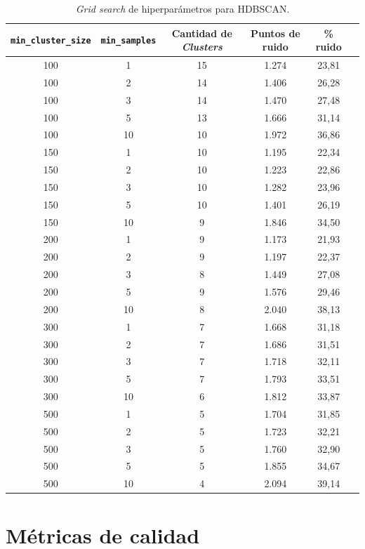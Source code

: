 \documentclass[a4paper,10pts,openany]{book}
\begin{document}
	\begin{table}[h]
		\centering
		\begin{tabular}{cccccc}
			\toprule
			\texttt{min\_cluster\_size} & \texttt{min\_samples} & Cantidad de \emph{Clusters} & Puntos de ruido & \% ruido \\
			\midrule
			100 & 1  & 15 & 1.274 & 23{,}81 \\
			100 & 2  & 14 & 1.406 & 26{,}28 \\
			100 & 3  & 14 & 1.470 & 27{,}48 \\
			100 & 5  & 13 & 1.666 & 31{,}14 \\
			100 & 10 & 10 & 1.972 & 36{,}86 \\
			150 & 1  & 10 & 1.195 & 22{,}34 \\
			150 & 2  & 10 & 1.223 & 22{,}86 \\
			150 & 3  & 10 & 1.282 & 23{,}96 \\
			150 & 5  & 10 & 1.401 & 26{,}19 \\
			150 & 10 & 9  & 1.846 & 34{,}50 \\
			200 & 1  & 9  & 1.173 & 21{,}93 \\
			200 & 2  & 9  & 1.197 & 22{,}37 \\
			200 & 3  & 8  & 1.449 & 27{,}08 \\
			200 & 5  & 9  & 1.576 & 29{,}46 \\
			200 & 10 & 8  & 2.040 & 38{,}13 \\
			300 & 1  & 7  & 1.668 & 31{,}18 \\
			300 & 2  & 7  & 1.686 & 31{,}51 \\
			300 & 3  & 7  & 1.718 & 32{,}11 \\
			300 & 5  & 7  & 1.793 & 33{,}51 \\
			300 & 10 & 6  & 1.812 & 33{,}87 \\
			500 & 1  & 5  & 1.704 & 31{,}85 \\
			500 & 2  & 5  & 1.723 & 32{,}21 \\
			500 & 3  & 5  & 1.760 & 32{,}90 \\
			500 & 5  & 5  & 1.855 & 34{,}67 \\
			500 & 10 & 4  & 2.094 & 39{,}14 \\
			\bottomrule
		\end{tabular}
		\caption{\emph{Grid search} de hiperparámetros para HDBSCAN.}
		\label{tab:gridsearch-hdbscan}
	\end{table}

	\section{Métricas de calidad}
	
\end{document}
